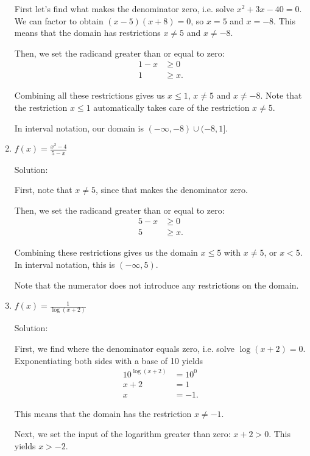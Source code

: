 \documentclass{ximera}
\begin{document}
\begin{enumerate}
\begin{expandable}
First let's find what makes the denominator zero, i.e. solve $x^2 + 3x - 40 = 0$. We can factor to obtain $(x - 5)(x + 8) = 0$, so $x = 5$ and $x = -8$. This means that the domain has restrictions $x \ne 5$ and $x \ne -8$. 

Then, we set the radicand greater than or equal to zero: \begin{align*}1 - x&\ge 0 \\ 1 & \ge x. \end{align*}

Combining all these restrictions gives us $x \le 1$, $x \ne 5$ and $x \ne -8$. Note that the restriction $x \le 1$ automatically takes care of the restriction $x \ne 5$. 

In interval notation, our domain is $(- \infty, -8) \cup (-8, 1]$. 
		\end{expandable}
	\item $f(x) = \frac{x^2 - 4}{5 - x}$
		\begin{expandable}
			Solution:

First, note that $x \ne 5$, since that makes the denominator zero.

Then, we set the radicand greater than or equal to zero: \begin{align*}5 - x&\ge 0 \\ 5 & \ge x. \end{align*}

Combining these restrictions gives us the domain $x \le 5$ with $x \ne 5$, or $x < 5$. In interval notation, this is $(-\infty, 5)$.

Note that the numerator does not introduce any restrictions on the domain. 

		\end{expandable}
	\item $f(x) = \frac{1}{\log(x + 2)}$
		\begin{expandable}
			Solution:

First, we find where the denominator equals zero, i.e. solve $\log(x + 2) = 0$. Exponentiating both sides with a base of 10 yields \begin{align*}10^{\log(x + 2)} & = 10^0 \\ x + 2 & = 1 \\ x & = -1. \end{align*}

This means that the domain has the restriction $x \ne -1$. 

Next, we set the input of the logarithm greater than zero: $x + 2 > 0$. This yields $x > -2$.


\end{expandable}
\end{enumerate}
\end{document}
